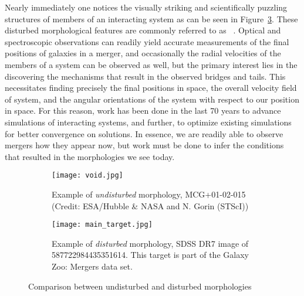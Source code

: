 Nearly immediately one notices the visually striking and
scientifically puzzling structures of members of an interacting system as can
be seen in Figure~\ref{fig:main}.
These disturbed morphological features are commonly
referred to as ~\cite{Toomre1972}.
Optical and spectroscopic observations can readily yield accurate measurements
of the final positions of galaxies in a merger, and occasionally the radial
velocities of the members of a system can be observed as well, but
the primary interest lies in the discovering the mechanisms that result in the
observed bridges and tails. This necessitates finding precisely the final
positions in space, the overall velocity field of system, and the angular
orientations of the system with respect to our position in space.
%
For this reason, work has been done
in the last 70 years to advance simulations of interacting systems, and further,
to optimize existing simulations for better convergence on solutions. In
essence, we are readily able to observe mergers how they appear now, but work must
be done to infer the conditions that resulted in the morphologies we see today.
%
\begin{figure}[h!]
    \begin{subfigure}[t]{0.5\linewidth}
        \centering
        \texttt{[image: void.jpg]}
        \caption{Example of \textit{undisturbed} morphology, MCG+01-02-015
                (Credit: ESA/Hubble \& NASA and N. Gorin (STScI))}
        \label{subfig:void}
    \end{subfigure}%
    \hspace{0.2cm}
    \begin{subfigure}[t]{0.5\linewidth}
        \centering
        \texttt{[image: main\_target.jpg]}
        \caption{Example of \textit{disturbed} morphology, SDSS DR7 image of
                587722984435351614. This target is part of the Galaxy Zoo: Mergers data set.}
        \label{subfig:main}
    \end{subfigure}
    \caption[Comparison between undisturbed and disturbed morphologies]%
    {Comparison between undisturbed and disturbed morphologies}
    \label{fig:main}
\end{figure}
%
